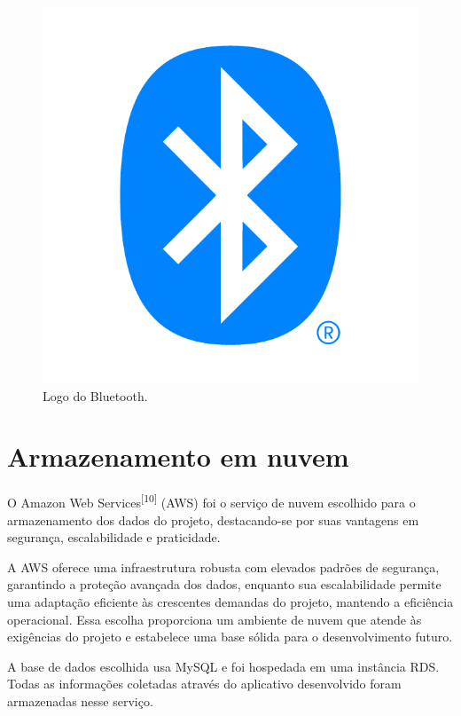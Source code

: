  \begin{figure}[hp]
    \centering
    
    \includegraphics[scale=0.4]{figures/bluetooth.png}
    
    \caption{Logo do Bluetooth.}
    
\end{figure}

\section{Armazenamento em nuvem}
O Amazon Web Services\textsuperscript{[10]} (AWS) foi o serviço de nuvem escolhido para o armazenamento dos dados do projeto, destacando-se por suas vantagens em segurança, escalabilidade e praticidade. 

A AWS oferece uma infraestrutura robusta com elevados padrões de segurança, garantindo a proteção avançada dos dados, enquanto sua escalabilidade permite uma adaptação eficiente às crescentes demandas do projeto, mantendo a eficiência operacional. Essa escolha proporciona um ambiente de nuvem que atende às exigências do projeto e estabelece uma base sólida para o desenvolvimento futuro.

A base de dados escolhida usa MySQL e foi hospedada em uma instância RDS. Todas as informações coletadas através do aplicativo desenvolvido foram armazenadas nesse serviço.

